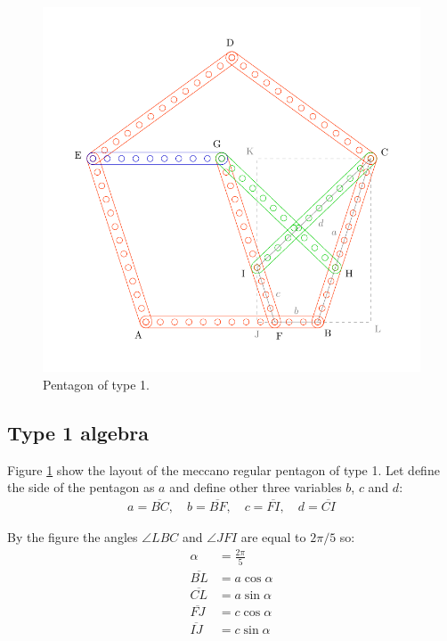 \documentclass[11pt]{article}
\begin{document}
\begin{figure}
\centering
\includegraphics[scale=0.8]{types/1}
\caption{Pentagon of type 1.}
\label{fig:type-1}
\end{figure}

\subsection{Type 1 algebra}

Figure \ref{fig:type-1} show the layout of the meccano regular pentagon of type 1.
Let define the side of the pentagon as $a$ and define other three variables $b$, $c$ and $d$:
\begin{align*}
a = \overline{BC},\quad
b = \overline{BF},\quad
c = \overline{FI},\quad
d = \overline{CI}
\end{align*}

By the figure the angles $\angle{LBC}$ and $\angle{JFI}$ are equal to $2\pi / 5$ so:
\begin{align*}
\alpha &= \frac{2\pi}{5}\\
\overline{BL} &= a\cos{\alpha}\\
\overline{CL} &= a\sin{\alpha}\\
\overline{FJ} &= c\cos{\alpha}\\
\overline{IJ} &= c\sin{\alpha}
\end{align*}
\end{document}

